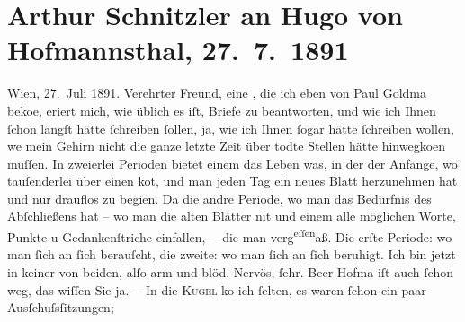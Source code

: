                \section[Arthur Schnitzler an Hugo von Hofmannsthal, 27. 7. 1891]{ Arthur Schnitzler an Hugo von Hofmannsthal, 27. 7. 1891}\nopagebreak{}\rehead{ }\begin{ledgroupsized}[t]{13cm}\normalsize\beginnumbering \toendnotes[C]{\smallbreak\pagebreak[2]} 
\toendnotes[C]{\smallbreak}\pstart
           \raggedleft{}{\pb}Wien, 27. Juli
                  1891.\pend
           \pstart
           Verehrter Freund, eine \label{K_L00025-3v}\label{K_L00025-3h}, die ich eben von Paul Goldma{\geminationn} beko{\geminationm}e, eri{\geminationn}ert mich,
               wie üblich es iſt, Briefe zu beantworten, und wie ich Ihnen ſchon längſt hätte
               ſchreiben ſollen, ja, wie ich Ihnen ſogar hätte ſchreiben wollen, we{\geminationn} mein Gehirn nicht die ganze letzte Zeit über todte
               Stellen hätte hinwegko{\geminationm}en müſſen. In zweierlei Perioden
               bietet einem das Leben was, in der der Anfänge, wo tauſenderlei über einen ko{\geminationm}t, und man {\pb}jeden Tag ein
               neues Blatt herzunehmen hat und nur drauflos zu begi{\geminationn}en.
                  Da{\geminationn} die andre Periode, wo man das Bedürfnis des
               Abſchließens hat – wo man die alten Blätter ni{\geminationm}t und
               einem alle möglichen Worte, Punkte u Gedankenſtriche einfallen, – die man verg\substVorne{}\textsuperscript{eſſen}\substDazwischen{}aß\substHinten{}{ }. Die erſte Periode: wo man ſich an ſich
               berauſcht, die zweite: wo man ſich an ſich beruhigt. Ich bin jetzt in keiner von
               beiden, alſo arm und blöd. Nervös, ſehr. Beer-{\pb}Hofma{\geminationn} iſt auch ſchon weg, das wiſſen Sie ja. – In die \textsc{Kugel} ko{\geminationm} ich ſelten, es waren ſchon ein paar Ausſchuſsſitzungen;

\end{ledgroupsized}
